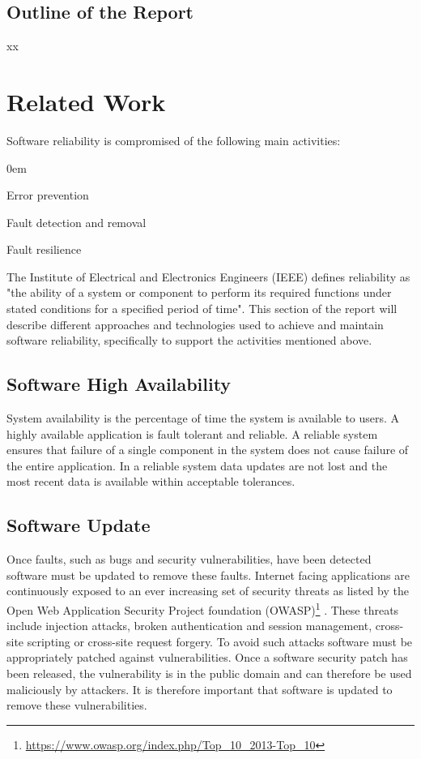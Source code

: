 \documentclass[a4paper,11pt,twoside]{report}
\begin{document}
\section{Outline of the Report}
xx



\chapter{Related Work}
Software reliability is compromised of the following main activities:

  \begin{list}{-}{}
  \itemsep0em
  \item Error prevention 
  
  \item Fault detection and removal
  
  \item Fault resilience
  \end{list}

\noindent
The Institute of Electrical and Electronics Engineers (IEEE) defines reliability as "the ability of a system or component to perform its required functions under stated conditions for a specified period of time". 
This section of the report will describe different approaches and technologies used to achieve and maintain software reliability, specifically to support the activities mentioned above. 

\section{Software High Availability }\label{subsec:rules}
System availability is the percentage of time the system is available to users. A highly available application is fault tolerant and reliable. A reliable system ensures that failure of a single component in the system does not cause failure of the entire application. In a reliable system data updates are not lost and the most recent data is available within acceptable tolerances. 


\section{Software Update} 
Once faults, such as bugs and security vulnerabilities, have been detected software must be updated to remove these faults. Internet facing applications are continuously exposed to an ever increasing set of security threats as listed by the Open Web Application Security Project foundation (OWASP)\footnote{\url{https://www.owasp.org/index.php/Top_10_2013-Top_10}} . These threats include injection attacks, broken authentication and session management, cross-site scripting or cross-site request forgery. To avoid such attacks software must be appropriately patched against vulnerabilities. Once a software security patch has been released, the vulnerability is in the public domain and can therefore be used maliciously by attackers. It is therefore important that software is updated to remove these vulnerabilities.
\end{document}
